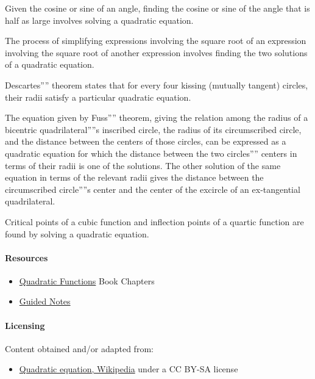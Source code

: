 Given the cosine or sine of an angle, finding the cosine or sine of the angle that is half as large involves solving a quadratic equation.

The process of simplifying expressions involving the square root of an expression involving the square root of another expression involves finding the two solutions of a quadratic equation.

Descartes'''' theorem states that for every four kissing (mutually tangent) circles, their radii satisfy a particular quadratic equation.

The equation given by Fuss'''' theorem, giving the relation among the radius of a bicentric quadrilateral''''s inscribed circle, the radius of its circumscribed circle, and the distance between the centers of those circles, can be expressed as a quadratic equation for which the distance between the two circles'''' centers in terms of their radii is one of the solutions. The other solution of the same equation in terms of the relevant radii gives the distance between the circumscribed circle''''s center and the center of the excircle of an ex-tangential quadrilateral.

Critical points of a cubic function and inflection points of a quartic function are found by solving a quadratic equation.

\paragraph{Resources}

\begin{itemize}
    \item \href{https://mathresearch.utsa.edu/wikiFiles/MAT1053/Quadratic_Functions/MAT1053_M2.2Quadratic_Functions.pdf}{Quadratic Functions} Book Chapters
\end{itemize}

\begin{itemize}
    \item \href{https://mathresearch.utsa.edu/wikiFiles/MAT1053/Quadratic_Functions/MAT1053_M2.2Quadratic_FunctionsGN.pdf}{Guided Notes}
\end{itemize}

\paragraph{Licensing}

Content obtained and/or adapted from:

\begin{itemize}
    \item \href{https://en.wikipedia.org/wiki/Quadratic_equation}{Quadratic equation, Wikipedia} under a CC BY-SA license
\end{itemize}


